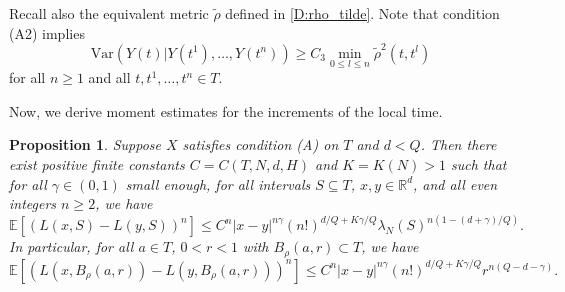 \documentclass[11pt, reqno]{amsart}
\newtheorem{proposition}[theorem]{Proposition}
\def\R{{\mathbb R}}
\def\E{{\mathbb E}}
\numberwithin{equation}{section}
\begin{document}
Recall also the equivalent metric $\tilde\rho$ defined in \eqref{D:rho_tilde}.
Note that condition (A2) implies
\begin{equation}\label{Eq:SLND_rho_tilde}
\mathrm{Var}(Y(t)| Y(t^1), \dots, Y(t^n)) \ge C_3 \min_{0 \le l \le n} \tilde{\rho}^2(t, t^l)
\end{equation}
for all $n \ge 1$ and all $t, t^1, \dots, t^n \in T$.

Now, we derive moment estimates for the increments of the local time.

\begin{proposition}\label{Prop:mom_LT_incre}
Suppose $X$ satisfies condition \textup{(A)} on $T$ and $d < Q$. 
Then there exist positive finite constants $C = C(T, N, d, H)$ and $K = K(N) > 1$ such that for all $\gamma \in (0, 1)$ 
small enough, for all intervals $S \subseteq T$,  $x, y \in \R^d$, and all even integers $n \ge 2$, we have
\[ \E[(L(x, S) - L(y, S))^n] \le C^n |x-y|^{n\gamma} (n!)^{d/Q + K\gamma/Q} \lambda_N(S)^{n(1-(d+\gamma)/Q)}. \]
In particular, for all $a \in T$, $0 < r < 1$ with $B_\rho(a, r) \subset T$, we have
\[ \E[(L(x, B_\rho(a, r)) - L(y, B_\rho(a, r)))^n] \le C^n |x-y|^{n\gamma} (n!)^{d/Q + K\gamma/Q} r^{n(Q-d-\gamma)}. \]
\end{proposition}
\end{document}
